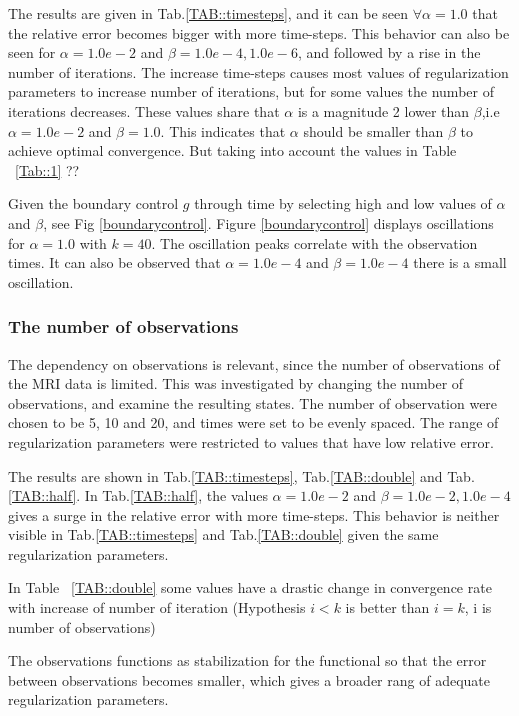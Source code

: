 \documentclass[11pt,a4paper]{article}
\begin{document}
The results are given in Tab.\ref{TAB::timesteps}, and it can be seen $\forall \alpha=1.0$ that the relative error becomes bigger with more time-steps. This behavior can also be seen for $\alpha=1.0e-2$ and $\beta = 1.0e-4 , 1.0e-6$, and followed by a rise in the number of iterations. The increase time-steps causes most values of regularization parameters to increase number of iterations, but for some values the number of iterations decreases.
These values share that $\alpha $ is a magnitude 2 lower than $ \beta$,i.e $\alpha=1.0e-2$ and $\beta =1.0$. This indicates that $\alpha $ should be smaller than $\beta$ to achieve optimal convergence. But taking into account the values in Table ~\ref{Tab::1} ??

Given the boundary control $g$ through time by selecting high and low values of $\alpha$ and $\beta$, see Fig \ref{boundarycontrol}. Figure \ref{boundarycontrol} displays oscillations for $\alpha=1.0$ with $k=40$. The oscillation peaks correlate with the observation times. It can also be observed that $\alpha=1.0e-4$ and $\beta=1.0e-4$ there is a small oscillation.






\subsubsection{The number of observations}
The dependency on observations is relevant, since the number of observations of the MRI data is limited. This was investigated by changing the number of observations, and examine the resulting states. The number of observation were chosen to be 5, 10  and 20, and times were set to be evenly spaced. The range of regularization parameters were restricted to values that have low relative error. 

The results are shown in Tab.\ref{TAB::timesteps}, Tab.\ref{TAB::double} and Tab.\ref{TAB::half}. In Tab.\ref{TAB::half}, the values $\alpha =1.0e-2$ and $\beta=1.0e-2,1.0e-4$ gives a surge in the relative error with more time-steps. This behavior is neither visible in Tab.\ref{TAB::timesteps} and Tab.\ref{TAB::double} given the same regularization parameters. 

In Table ~\ref{TAB::double} some values have a drastic change in convergence rate with increase of number of iteration (Hypothesis $i < k$ is better than $i = k$, i is number of observations)


The observations functions as stabilization for the functional so that the error between observations becomes smaller, which gives a broader rang of adequate regularization parameters.
\end{document}
